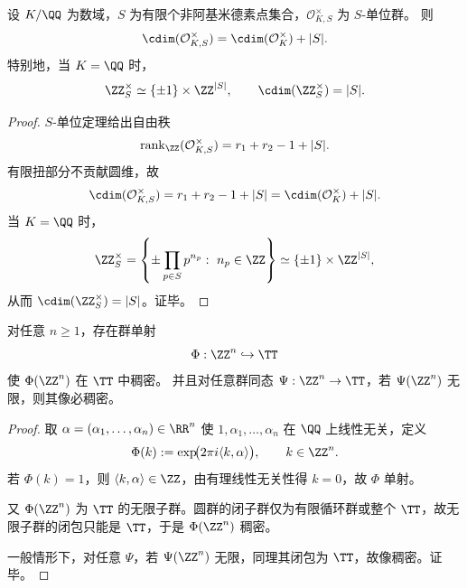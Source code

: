 \begin{theorem}[\(S\)-单位圆维线性增长律]\label{thm:conclusion-sunit-cdim-linear-growth}
设 \(K/\QQ\) 为数域，\(S\) 为有限个非阿基米德素点集合，\(\mathcal O_{K,S}^\times\) 为 \(S\)-单位群。
则
\[
\cdim(\mathcal O_{K,S}^\times)=\cdim(\mathcal O_K^\times)+|S|.
\]
特别地，当 \(K=\QQ\) 时，
\[
\ZZ_S^\times\simeq \{\pm1\}\times \ZZ^{|S|},
\qquad
\cdim(\ZZ_S^\times)=|S|.
\]
\end{theorem}
\begin{proof}
\(S\)-单位定理给出自由秩
\[
\operatorname{rank}_{\ZZ}(\mathcal O_{K,S}^\times)=r_1+r_2-1+|S|.
\]
有限扭部分不贡献圆维，故
\[
\cdim(\mathcal O_{K,S}^\times)=r_1+r_2-1+|S|
=\cdim(\mathcal O_K^\times)+|S|.
\]
当 \(K=\QQ\) 时，
\[
\ZZ_S^\times=\left\{\pm\prod_{p\in S}p^{n_p}:\ n_p\in\ZZ\right\}
\simeq\{\pm1\}\times\ZZ^{|S|},
\]
从而 \(\cdim(\ZZ_S^\times)=|S|\)。证毕。
\end{proof}

\begin{theorem}[高圆维格点可单相位单射压入且像必稠密]\label{thm:conclusion-zn-to-circle-injective-dense}
对任意 \(n\ge 1\)，存在群单射
\[
\Phi:\ZZ^n\hookrightarrow \TT
\]
使 \(\Phi(\ZZ^n)\) 在 \(\TT\) 中稠密。
并且对任意群同态 \(\Psi:\ZZ^n\to\TT\)，若 \(\Psi(\ZZ^n)\) 无限，则其像必稠密。
\end{theorem}
\begin{proof}
取 \(\alpha=(\alpha_1,\dots,\alpha_n)\in\RR^n\) 使 \(1,\alpha_1,\dots,\alpha_n\) 在 \(\QQ\) 上线性无关，定义
\[
\Phi(k):=\exp\!\bigl(2\pi i\langle k,\alpha\rangle\bigr),\qquad k\in\ZZ^n.
\]
若 \(\Phi(k)=1\)，则 \(\langle k,\alpha\rangle\in\ZZ\)，由有理线性无关性得 \(k=0\)，故 \(\Phi\) 单射。

又 \(\Phi(\ZZ^n)\) 为 \(\TT\) 的无限子群。圆群的闭子群仅为有限循环群或整个 \(\TT\)，故无限子群的闭包只能是 \(\TT\)，于是 \(\Phi(\ZZ^n)\) 稠密。

一般情形下，对任意 \(\Psi\)，若 \(\Psi(\ZZ^n)\) 无限，同理其闭包为 \(\TT\)，故像稠密。证毕。
\end{proof}

